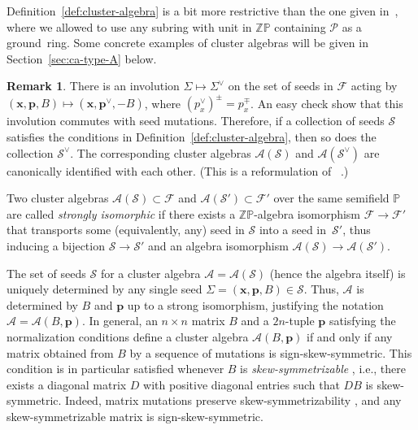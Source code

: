 \documentclass[letterpaper]{amsart}
\numberwithin{equation}{section}
\theoremstyle{definition}
\newtheorem{remark}[theorem]{Remark}
\newtheorem{definition}[theorem]{Definition}
\def\AA{\mathcal{A}}
\def\ZZ{\mathbb{Z}}
\def\PP{\mathbb{P}}
\def\xx{\mathbf{x}}
\def\pp{\mathbf{p}}
\def\FFcal{\mathcal{F}}
\begin{document}
Definition~\ref{def:cluster-algebra} is a bit more restrictive than the one given 
in~\cite{fz-clust1}, where we allowed to use any subring with unit in 
$\ZZ\PP$ containing $\mathcal{P}$ as a ground~ring. 
Some concrete examples of cluster algebras will be given in 
Section~\ref{sec:ca-type-A} below. 
 
 
\begin{remark} 
\label{rem:sign-symmetry} 
There is an involution $\Sigma \mapsto \Sigma^\vee$ on the set of 
seeds in $\FFcal$ acting by $(\xx,\pp,B) \mapsto (\xx, \pp^\vee,-B)$, 
where $(p^\vee_x)^\pm = p_x^\mp$. 
An easy check show that this involution commutes with seed 
mutations. 
Therefore, if a collection of seeds $\mathcal{S}$ 
satisfies the conditions in Definition~\ref{def:cluster-algebra}, 
then so does the collection $\mathcal{S}^\vee$. 
The corresponding cluster algebras $\AA(\mathcal{S})$ and 
$\AA(\mathcal{S}^\vee)$ are canonically identified with each other. 
(This is a reformulation of ~\cite[(2.8)]{fz-clust1}.) 
\end{remark} 
 
 
Two cluster algebras $\AA(\mathcal{S})\subset\FFcal$ and 
$\AA(\mathcal{S}')\subset\FFcal'$ over the same semifield $\PP$ 
are called \emph{strongly isomorphic} 
if there exists a 
$\ZZ \PP$-algebra 
isomorphism $\FFcal\to\FFcal'$ 
that transports some (equivalently, any) seed in $\mathcal{S}$ into a 
seed  in~$\mathcal{S}'$, thus inducing a bijection 
$\mathcal{S}\to\mathcal{S}'$ 
and an algebra isomorphism $\AA(\mathcal{S})\to\AA(\mathcal{S}')$. 
 
 
The set of seeds $\mathcal{S}$ for a cluster algebra 
$\AA=\AA(\mathcal{S})$ (hence the algebra itself) 
is uniquely determined by any single seed 
$\Sigma= (\xx, \pp, B)\in\mathcal{S}$. 
Thus, $\AA$ is determined by $B$ and $\pp$ up to a strong 
isomorphism, justifying the notation $\AA=\AA(B,\pp)$. 
In general, an $n\times n$ matrix $B$ and a $2n$-tuple $\pp$ 
satisfying the normalization conditions define a cluster algebra 
$\AA(B,\pp)$ if and only if any matrix obtained from $B$ by a sequence 
of mutations is sign-skew-symmetric. 
This condition is in particular satisfied whenever $B$ is 
\emph{skew-symmetrizable} \cite[Definition~4.4]{fz-clust1}, i.e., 
there exists a diagonal matrix $D$ 
with positive diagonal entries such that $DB$ is skew-symmetric. 
Indeed, matrix mutations preserve skew-symmetrizability 
\cite[Proposition~4.5]{fz-clust1}, 
and any skew-symmetrizable matrix is sign-skew-symmetric. 
 
\end{document}
